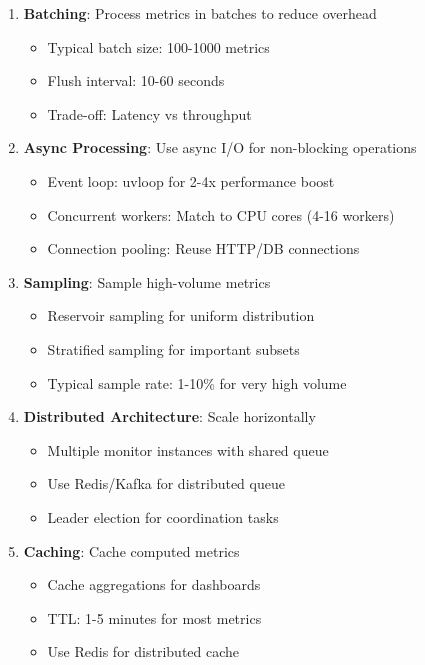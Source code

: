 \begin{enumerate}
    \item \textbf{Batching}: Process metrics in batches to reduce overhead
    \begin{itemize}
        \item Typical batch size: 100-1000 metrics
        \item Flush interval: 10-60 seconds
        \item Trade-off: Latency vs throughput
    \end{itemize}

    \item \textbf{Async Processing}: Use async I/O for non-blocking operations
    \begin{itemize}
        \item Event loop: uvloop for 2-4x performance boost
        \item Concurrent workers: Match to CPU cores (4-16 workers)
        \item Connection pooling: Reuse HTTP/DB connections
    \end{itemize}

    \item \textbf{Sampling}: Sample high-volume metrics
    \begin{itemize}
        \item Reservoir sampling for uniform distribution
        \item Stratified sampling for important subsets
        \item Typical sample rate: 1-10\% for very high volume
    \end{itemize}

    \item \textbf{Distributed Architecture}: Scale horizontally
    \begin{itemize}
        \item Multiple monitor instances with shared queue
        \item Use Redis/Kafka for distributed queue
        \item Leader election for coordination tasks
    \end{itemize}

    \item \textbf{Caching}: Cache computed metrics
    \begin{itemize}
        \item Cache aggregations for dashboards
        \item TTL: 1-5 minutes for most metrics
        \item Use Redis for distributed cache
    \end{itemize}
\end{enumerate}

